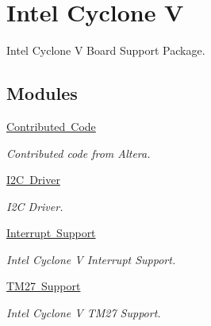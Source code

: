 \hypertarget{group__RTEMSBSPsARMCycV}{}\section{Intel Cyclone V}
\label{group__RTEMSBSPsARMCycV}


Intel Cyclone V Board Support Package.  


\subsection*{Modules}
\begin{DoxyCompactItemize}
\item 
\mbox{\hyperlink{group__RTEMSBSPsARMCycVContrib}{Contributed Code}}
\begin{DoxyCompactList}\small\item\em Contributed code from Altera. \end{DoxyCompactList}\item 
\mbox{\hyperlink{group__RTEMSBSPsARMCycVI2C}{I2\+C Driver}}
\begin{DoxyCompactList}\small\item\em I2C Driver. \end{DoxyCompactList}\item 
\mbox{\hyperlink{group__RTEMSBSPsARMCycVIRQ}{Interrupt Support}}
\begin{DoxyCompactList}\small\item\em Intel Cyclone V Interrupt Support. \end{DoxyCompactList}\item 
\mbox{\hyperlink{group__RTEMSBSPsARMCycTM27}{T\+M27 Support}}
\begin{DoxyCompactList}\small\item\em Intel Cyclone V T\+M27 Support. \end{DoxyCompactList}\end{DoxyCompactItemize}
